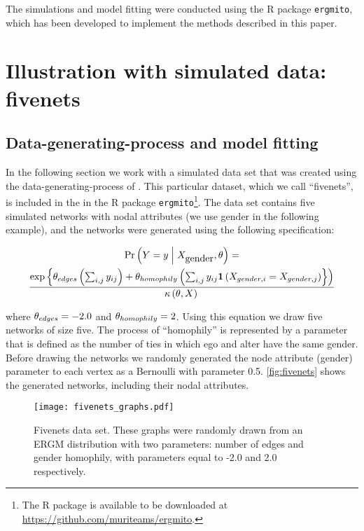 \documentclass[12pt]{article}
\begin{document}
The simulations and model fitting were conducted using the R package \texttt{ergmito}, which has been developed to implement the methods described in this paper.

\section{Illustration with simulated data: fivenets}

\subsection{Data-generating-process and model fitting}

In the following section we work with a simulated data set that was created using the data-generating-process of \ergmitos{}. This particular dataset, which we call ``fivenets'', is included in the in the R package \texttt{ergmito}\footnote{The R package is available to be downloaded at  \url{https://github.com/muriteams/ergmito}.}. The data set contains five simulated networks with nodal attributes (we use gender in the following example), and the networks were generated using the following specification:

\begin{multline*}
\Prcond{\Adjmat = \adjmat}{\Indepvar_{\mbox{gender}}, \params} = \\
\frac{ %
    \exp{\params_{edges}\left(\sum_{i,j} \adjmat_{ij}\right) + %
    \params_{homophily}\left(\sum_{i,j} \adjmat_{ij}\isone{\Indepvar_{gender, i} = \Indepvar_{gender, j}}}\right) %
    }{%
    \normconst{}
    }
\end{multline*}

\noindent where $\theta_{edges} = -2.0$ and $\theta_{homophily} = 2$. Using this equation we draw five networks of size five. The process of ``homophily'' is represented by a parameter that is defined as the number of ties in which ego and alter have the same gender. Before drawing the networks we randomly generated the node attribute (gender) parameter to each vertex as a Bernoulli with parameter 0.5. \autoref{fig:fivenets} shows the generated networks, including their nodal attributes.

\begin{figure}[tb]
    \centering
    \texttt{[image: fivenets\_graphs.pdf]}
    \caption{\label{fig:fivenets}Fivenets data set. These graphs were randomly drawn from an ERGM distribution with two parameters: number of edges and gender homophily, with parameters equal to -2.0 and 2.0 respectively.}
    \label{fig:my_label}
\end{figure}
\end{document}
